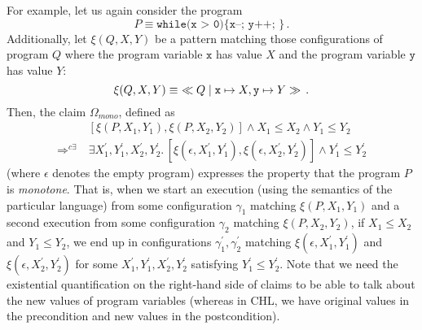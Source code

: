 For example, let us again consider the program
\begin{equation*}
  P \equiv \texttt{while(x > 0)\{ x--; y++; \}} \, .
\end{equation*}
Additionally, let $\xi(Q, X, Y)$ be a pattern matching those configurations of
program $Q$ where the program variable $\texttt{x}$ has value $X$ and the program
variable $\texttt{y}$ has value $Y$:
\begin{equation}\label{eqn:CQXY}
 \xi(Q, X, Y) \equiv\ \ll\texttt{$Q$}\mid \texttt{x}\mapsto X, \texttt{y}\mapsto Y \gg  \, .
\end{equation}
Then, the claim $\Omega_{\textit{mono}}$, defined as
\begin{align*}
&[\xi(P, X_1, Y_1),\xi(P, X_2, Y_2)] \land X_1 \leq X_2 \land Y_1 \leq Y_2
\\ \Rightarrow^{c\exists}\ &
\exists X^\prime_1, Y^\prime_1, X^\prime_2, Y^\prime_2.\,  [\xi(\epsilon, X^\prime_1, Y^\prime_1), \xi(\epsilon, X^\prime_2, Y^\prime_2)] \land Y^\prime_1 \leq Y^\prime_2   
\end{align*}
(where $\epsilon$ denotes the empty program)
expresses the property that the program $P$ is \emph{monotone}.
That is, when we start an execution (using the semantics of the particular language)
from some configuration $\gamma_1$ matching $\xi(P, X_1, Y_1)$
and a second execution from some configuration $\gamma_2$ matching $\xi(P, X_2, Y_2)$,
if $X_1 \leq X_2$ and $Y_1 \leq Y_2$,
we end up in configurations $\gamma_1^\prime,\gamma_2^\prime$ matching
$\xi(\epsilon, X^\prime_1, Y^\prime_1)$ and $\xi(\epsilon, X^\prime_2, Y^\prime_2)$
for some $X^\prime_1,Y^\prime_1,X^\prime_2,Y^\prime_2$
satisfying $Y^\prime_1 \leq Y^\prime_2$.
%
Note that we need the existential quantification on the right-hand side of
claims to be able to talk about the new values of program variables (whereas
in CHL, we have original values in the precondition and new values in the postcondition).

